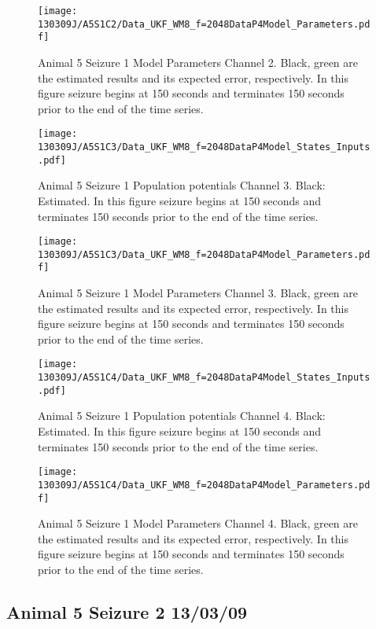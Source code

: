 \begin{figure}
	\centering
		\texttt{[image: 130309J/A5S1C2/Data\_UKF\_WM8\_f=2048DataP4Model\_Parameters.pdf]}
	\caption{Animal 5 Seizure 1 Model Parameters Channel 2. Black, green are the estimated results and its expected error, respectively. In this figure seizure begins at 150 seconds and terminates 150 seconds prior to the end of the time series.}
	\label{fig: A5S1C2 MP}
\end{figure}

\begin{figure}
	\centering
		\texttt{[image: 130309J/A5S1C3/Data\_UKF\_WM8\_f=2048DataP4Model\_States\_Inputs.pdf]}
	\caption{Animal 5 Seizure 1 Population potentials Channel 3. Black: Estimated. In this figure seizure begins at 150 seconds and terminates 150 seconds prior to the end of the time series.}
	\label{fig: A5S1C3 PP}
\end{figure}


\begin{figure}
	\centering
		\texttt{[image: 130309J/A5S1C3/Data\_UKF\_WM8\_f=2048DataP4Model\_Parameters.pdf]}
	\caption{Animal 5 Seizure 1 Model Parameters Channel 3. Black, green are the estimated results and its expected error, respectively. In this figure seizure begins at 150 seconds and terminates 150 seconds prior to the end of the time series.}
	\label{fig: A5S1C3 MP}
\end{figure}

\begin{figure}
	\centering
		\texttt{[image: 130309J/A5S1C4/Data\_UKF\_WM8\_f=2048DataP4Model\_States\_Inputs.pdf]}
	\caption{Animal 5 Seizure 1 Population potentials Channel 4. Black: Estimated. In this figure seizure begins at 150 seconds and terminates 150 seconds prior to the end of the time series.}
	\label{fig: A5S1C4 PP}
\end{figure}

\begin{figure}
	\centering
		\texttt{[image: 130309J/A5S1C4/Data\_UKF\_WM8\_f=2048DataP4Model\_Parameters.pdf]}
	\caption{Animal 5 Seizure 1 Model Parameters Channel 4. Black, green are the estimated results and its expected error, respectively. In this figure seizure begins at 150 seconds and terminates 150 seconds prior to the end of the time series.}
	\label{fig: A5S1C4 MP}
\end{figure}

\subsection{Animal 5 Seizure 2 13/03/09}

